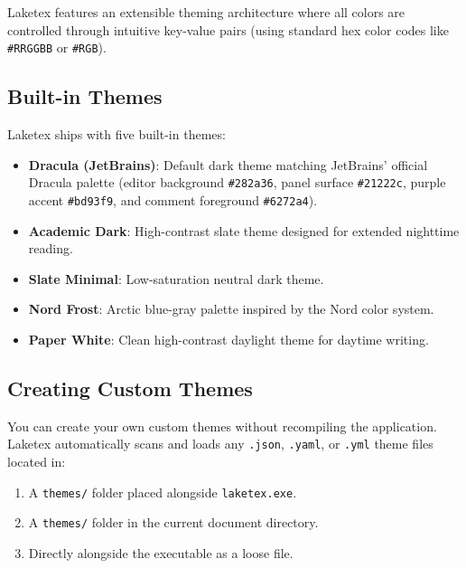 \documentclass[11pt, a4paper]{article}
\begin{document}
Laketex features an extensible theming architecture where all colors are controlled through intuitive key-value pairs (using standard hex color codes like \texttt{\#RRGGBB} or \texttt{\#RGB}).

\subsection{Built-in Themes}
Laketex ships with five built-in themes:
\begin{itemize}
    \item \textbf{Dracula (JetBrains)}: Default dark theme matching JetBrains' official Dracula palette (editor background \texttt{\#282a36}, panel surface \texttt{\#21222c}, purple accent \texttt{\#bd93f9}, and comment foreground \texttt{\#6272a4}).
    \item \textbf{Academic Dark}: High-contrast slate theme designed for extended nighttime reading.
    \item \textbf{Slate Minimal}: Low-saturation neutral dark theme.
    \item \textbf{Nord Frost}: Arctic blue-gray palette inspired by the Nord color system.
    \item \textbf{Paper White}: Clean high-contrast daylight theme for daytime writing.
\end{itemize}

\subsection{Creating Custom Themes}
You can create your own custom themes without recompiling the application. Laketex automatically scans and loads any \texttt{.json}, \texttt{.yaml}, or \texttt{.yml} theme files located in:
\begin{enumerate}
    \item A \texttt{themes/} folder placed alongside \texttt{laketex.exe}.
    \item A \texttt{themes/} folder in the current document directory.
    \item Directly alongside the executable as a loose file.
\end{enumerate}
\end{document}
